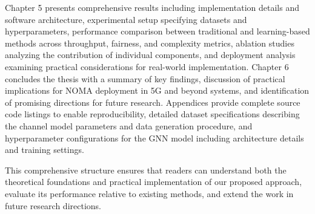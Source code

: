 Chapter 5 presents comprehensive results including implementation details and software architecture, experimental setup specifying datasets and hyperparameters, performance comparison between traditional and learning-based methods across throughput, fairness, and complexity metrics, ablation studies analyzing the contribution of individual components, and deployment analysis examining practical considerations for real-world implementation. Chapter 6 concludes the thesis with a summary of key findings, discussion of practical implications for NOMA deployment in 5G and beyond systems, and identification of promising directions for future research. Appendices provide complete source code listings to enable reproducibility, detailed dataset specifications describing the channel model parameters and data generation procedure, and hyperparameter configurations for the GNN model including architecture details and training settings.

This comprehensive structure ensures that readers can understand both the theoretical foundations and practical implementation of our proposed approach, evaluate its performance relative to existing methods, and extend the work in future research directions.
